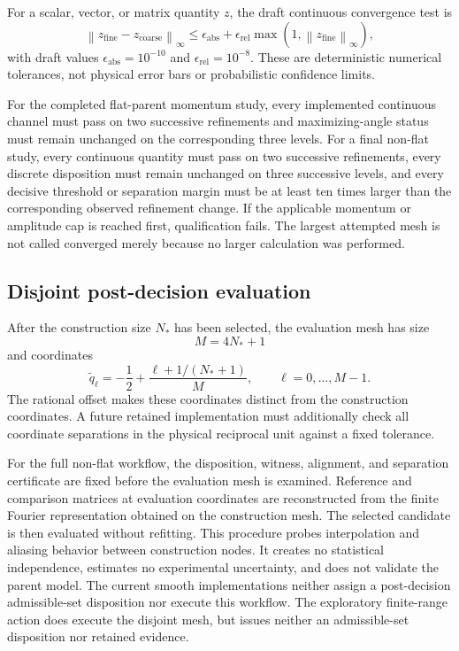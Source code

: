 \documentclass[11pt]{article}
\newcommand{\norm}[1]{\left\lVert #1\right\rVert}
\begin{document}
For a scalar, vector, or matrix quantity $z$, the draft continuous convergence test is
\begin{equation}
 \norm{z_{\mathrm{fine}}-z_{\mathrm{coarse}}}_\infty
 \le
 \epsilon_{\mathrm{abs}}
 +\epsilon_{\mathrm{rel}}
  \max\!\left(1,\norm{z_{\mathrm{fine}}}_\infty\right),
 \label{eq:convergence-test}
\end{equation}
with draft values
$\epsilon_{\mathrm{abs}}=10^{-10}$ and
$\epsilon_{\mathrm{rel}}=10^{-8}$. These are deterministic numerical tolerances, not
physical error bars or probabilistic confidence limits.

For the completed flat-parent momentum study, every implemented continuous channel must
pass on two successive refinements and maximizing-angle status must remain unchanged on
the corresponding three levels. For a final non-flat study, every continuous
quantity must pass on two successive refinements, every discrete disposition must remain
unchanged on three successive levels, and every decisive threshold or separation margin
must be at least ten times larger than the corresponding observed refinement change. If
the applicable momentum or amplitude cap is reached first, qualification fails. The
largest attempted mesh is not called converged merely because no larger calculation was
performed.

\subsection{Disjoint post-decision evaluation}

After the construction size $N_*$ has been selected, the evaluation mesh has size
\begin{equation}
 M=4N_*+1
 \label{eq:evaluation-size}
\end{equation}
and coordinates
\begin{equation}
 \widetilde q_\ell=-\frac12+
 \frac{\ell+1/(N_*+1)}{M},
 \qquad \ell=0,\ldots,M-1.
 \label{eq:evaluation-mesh}
\end{equation}
The rational offset makes these coordinates distinct from the construction coordinates.
A future retained implementation must additionally check all coordinate separations in
the physical reciprocal unit against a fixed tolerance.

For the full non-flat workflow, the disposition, witness, alignment, and
separation certificate are fixed before the evaluation mesh is examined. Reference and
comparison matrices at evaluation coordinates are reconstructed from the finite Fourier
representation obtained on the construction mesh. The selected candidate is then
evaluated without refitting. This procedure probes interpolation and aliasing behavior
between construction nodes. It creates no statistical independence, estimates no
experimental uncertainty, and does not validate the parent model. The current smooth
implementations neither assign a post-decision admissible-set disposition nor execute
this workflow. The exploratory finite-range action does execute the disjoint mesh, but
issues neither an admissible-set disposition nor retained evidence.
\end{document}
